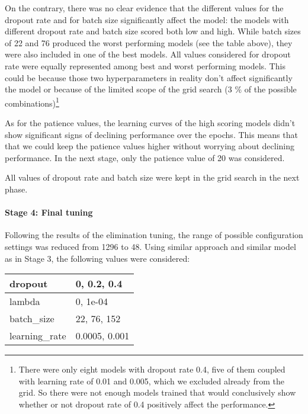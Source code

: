 \documentclass[]{article}
\let\oldparagraph\paragraph
\renewcommand{\paragraph}[1]{\oldparagraph{#1}\mbox{}}
\let\rmarkdownfootnote\footnote%
\def\footnote{\protect\rmarkdownfootnote}
\begin{document}
On the contrary, there was no clear evidence that the different values
for the dropout rate and for batch size significantly affect the model:
the models with different dropout rate and batch size scored both low
and high. While batch sizes of 22 and 76 produced the worst performing
models (see the table above), they were also included in one of the best
models. All values considered for dropout rate were equally represented
among best and worst performing models. This could be because those two
hyperparameters in reality don't affect significantly the model or
because of the limited scope of the grid search (3 \% of the possible
combinations)\footnote{There were only eight models with dropout rate
  0.4, five of them coupled with learning rate of 0.01 and 0.005, which
  we excluded already from the grid. So there were not enough models
  trained that would conclusively show whether or not dropout rate of
  0.4 positively affect the performance.}

As for the patience values, the learning curves of the high scoring
models didn't show significant signs of declining performance over the
epochs. This means that that we could keep the patience values higher
without worrying about declining performance. In the next stage, only
the patience value of 20 was considered.

All values of dropout rate and batch size were kept in the grid search
in the next phase.

\hypertarget{stage-4-final-tuning}{%
\paragraph{Stage 4: Final tuning}\label{stage-4-final-tuning}}

Following the results of the elimination tuning, the range of possible
configuration settings was reduced from 1296 to 48. Using similar
approach and similar model as in Stage 3, the following values were
considered:

\begin{table}[H]
\centering
\begin{tabular}{l|l}
\hline
dropout & 0, 0.2, 0.4\\
\hline
lambda & 0, 1e-04\\
\hline
batch\_size & 22, 76, 152\\
\hline
learning\_rate & 0.0005, 0.001\\
\hline
\end{tabular}
\end{table}
\end{document}
